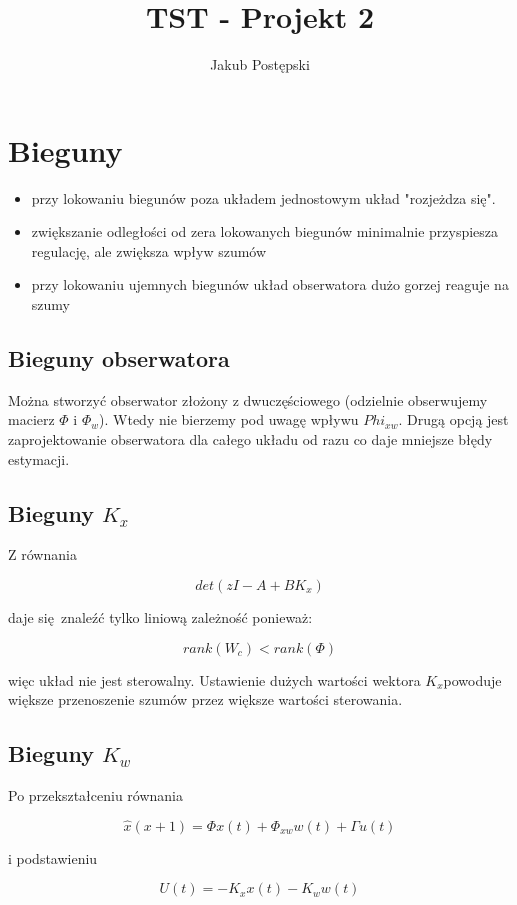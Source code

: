 \documentclass[a4paper]{article}
\title{TST - Projekt 2}
\author{Jakub Postępski}
\begin{document}
\maketitle


\section{Bieguny}
\begin{itemize}

	\item przy lokowaniu biegunów poza układem jednostowym układ "rozjeżdza się".
	\item zwiększanie odległości od zera lokowanych biegunów minimalnie przyspiesza regulację, ale zwiększa wpływ szumów
	\item przy lokowaniu ujemnych biegunów układ obserwatora dużo gorzej reaguje na szumy
\end{itemize}

\subsection{Bieguny obserwatora}
Można stworzyć obserwator złożony z dwuczęściowego (odzielnie obserwujemy macierz $\Phi$ i $\Phi_w$). Wtedy nie bierzemy pod uwagę wpływu $Phi_{xw}$. Drugą opcją jest zaprojektowanie obserwatora dla całego układu od razu co daje mniejsze błędy estymacji.

\subsection{Bieguny $K_x$}
Z równania 

\[det(zI - A + BK_x)\]

daje się znaleźć tylko liniową zależność ponieważ:

\[rank(W_c) < rank(\Phi)\] 

więc układ nie jest sterowalny. Ustawienie dużych wartości wektora $K_x$powoduje większe przenoszenie szumów przez większe wartości sterowania.

\subsection{Bieguny $K_w$}
Po przekształceniu równania 

\[ \hat{x}(x+1) = \Phi x(t) + \Phi_{xw}w(t) + \Gamma u(t) \]

i podstawieniu 

\[ U(t) = -K_xx(t)-K_ww(t) \]
\end{document}
